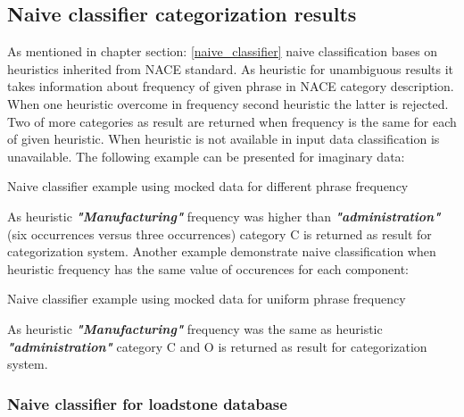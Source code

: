     
\subsection{Naive classifier categorization results}
As mentioned in chapter section: \ref{naive_classifier} naive classification bases on heuristics inherited from NACE standard. As heuristic for unambiguous results it takes information about frequency of given phrase in NACE category description. When one heuristic overcome in frequency second heuristic the latter is rejected. Two of more categories as result are returned when frequency is the same for each of given heuristic. When heuristic is not available in input data classification is unavailable. The following example can be presented for imaginary data:
\begin{algorithm}
	
	\hfill \break
	\caption{Naive classifier example using mocked data for different phrase frequency}
	\label{alg:3rd}
\end{algorithm}
\newline
As heuristic \textbf{\textit{"Manufacturing"}} frequency was higher than \textbf{\textit{"administration"}} (six occurrences versus three occurrences) category C is returned as result for categorization system.
\newline
Another example demonstrate naive classification when heuristic frequency has the same value of occurences for each component:
\begin{algorithm}
	
	\hfill \break
	\caption{Naive classifier example using mocked data for uniform phrase frequency}
	\label{alg:4th}
\end{algorithm}
\newline  
As heuristic \textbf{\textit{"Manufacturing"}} frequency was the same as heuristic \textbf{\textit{"administration"}} category C and O is returned as result for categorization system.

\subsubsection{Naive classifier for loadstone database}

